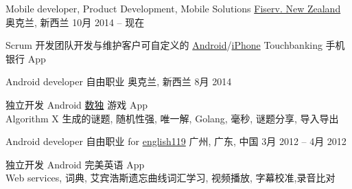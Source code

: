 
\begin{cventries}
	\cventry
	{Mobile developer, Product Development, Mobile Solutions}
	{\href{https://www.careers.fiserv.com/new-zealand}{Fiserv. New Zealand}}
	{奥克兰, \enskip 新西兰}
	{10月 2014 – 现在}
	{
		\begin{cvitems}
			\item {Scrum 开发团队开发与维护客户可自定义的 \href{https://play.google.com/store/apps/details?id=com.fiserv.touchbankingasp&hl=en}{Android}/\href{https://itunes.apple.com/us/app/touchbanking/id386678211?mt=8}{iPhone} Touchbanking 手机银行 App}
		\end{cvitems}
	}
\end{cventries}

\begin{cventries}
	\cventry
	{Android developer}
	{自由职业}
	{奥克兰, \enskip 新西兰}
	{8月 2014}
	{
		\begin{cvitems}
			\item {独立开发 Android \href{https://play.google.com/store/apps/details?id=com.gmail.jiangyang5157.sudoku}{数独} 游戏 App\\
			Algorithm X 生成的谜题, 随机性强, 唯一解, Golang, 毫秒, 谜题分享, 导入导出}
		\end{cvitems}
	}
\end{cventries}

\begin{cventries}
	\cventry
	{Android developer}
	{自由职业 for \href{http://www.english119.cn}{english119}}
	{广州, \enskip 广东, \enskip 中国}
	{3月 2012 – 4月 2012}
	{
		\begin{cvitems}
			\item {独立开发 Android 完美英语 App\\
				Web services, 词典, 艾宾浩斯遗忘曲线词汇学习, 视频播放, 字幕校准,录音比对}
		\end{cvitems}
	}
\end{cventries}

